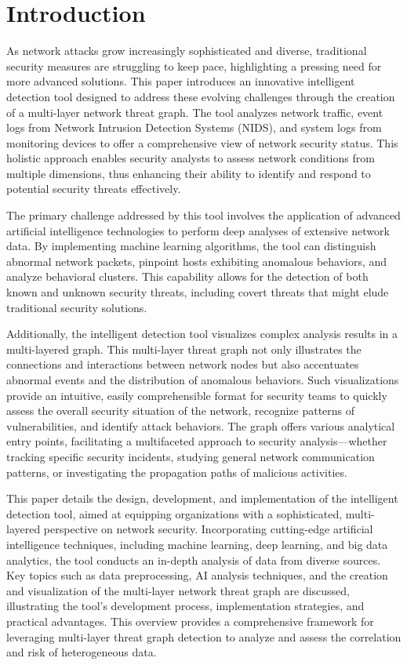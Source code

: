 \section{Introduction}
As network attacks grow increasingly sophisticated and diverse, traditional security measures are struggling to keep pace, highlighting a pressing need for more advanced solutions. This paper introduces an innovative intelligent detection tool designed to address these evolving challenges through the creation of a multi-layer network threat graph. The tool analyzes network traffic, event logs from Network Intrusion Detection Systems (NIDS), and system logs from monitoring devices to offer a comprehensive view of network security status. This holistic approach enables security analysts to assess network conditions from multiple dimensions, thus enhancing their ability to identify and respond to potential security threats effectively.

The primary challenge addressed by this tool involves the application of advanced artificial intelligence technologies to perform deep analyses of extensive network data. By implementing machine learning algorithms, the tool can distinguish abnormal network packets, pinpoint hosts exhibiting anomalous behaviors, and analyze behavioral clusters. This capability allows for the detection of both known and unknown security threats, including covert threats that might elude traditional security solutions.

Additionally, the intelligent detection tool visualizes complex analysis results in a multi-layered graph. This multi-layer threat graph not only illustrates the connections and interactions between network nodes but also accentuates abnormal events and the distribution of anomalous behaviors. Such visualizations provide an intuitive, easily comprehensible format for security teams to quickly assess the overall security situation of the network, recognize patterns of vulnerabilities, and identify attack behaviors. The graph offers various analytical entry points, facilitating a multifaceted approach to security analysis—whether tracking specific security incidents, studying general network communication patterns, or investigating the propagation paths of malicious activities.

This paper details the design, development, and implementation of the intelligent detection tool, aimed at equipping organizations with a sophisticated, multi-layered perspective on network security. Incorporating cutting-edge artificial intelligence techniques, including machine learning, deep learning, and big data analytics, the tool conducts an in-depth analysis of data from diverse sources. Key topics such as data preprocessing, AI analysis techniques, and the creation and visualization of the multi-layer network threat graph are discussed, illustrating the tool's development process, implementation strategies, and practical advantages. This overview provides a comprehensive framework for leveraging multi-layer threat graph detection to analyze and assess the correlation and risk of heterogeneous data.